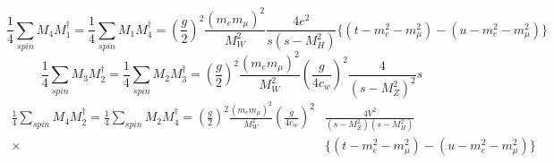\documentclass[11pt]{article}
\begin{document}
    \begin{equation}
    \frac{1}{4}\sum_{spin} M_4 M_1^{\dagger}=\frac{1}{4}\sum_{spin} M_1 M_4^{\dagger}=\left(\frac{g}{2}\right)^2\frac{(m_em_\mu)^2}{M_W^2}\frac{4e^2}{s(s-M_H^2)}\{ (t-m_e^2-m_\mu^2)-(u-m_e^2-m_\mu^2) \}
    \end{equation}
    \begin{equation}
    \frac{1}{4}\sum_{spin} M_3 M_2^{\dagger}=\frac{1}{4}\sum_{spin} M_2 M_3^{\dagger}=\left(\frac{g}{2}\right)^2\frac{(m_em_\mu)^2}{M_W^2}\left(\frac{g}{4c_w}\right)^2\frac{4}{(s-M_Z^2)^2}s
    \end{equation}
    \begin{equation}
    \begin{split}
    \frac{1}{4}\sum_{spin} M_4 M_2^{\dagger}=\frac{1}{4}\sum_{spin} M_2 M_4^{\dagger}=\left(\frac{g}{2}\right)^2\frac{(m_em_\mu)^2}{M_W^2}\left(\frac{g}{4c_w}\right)^2&\frac{4V^2}{(s-M_Z^2)(s-M_H^2)}\\
    \times&\{ (t-m_e^2-m_\mu^2)-(u-m_e^2-m_\mu^2) \}
    \end{split}
    \end{equation}
\end{document}
